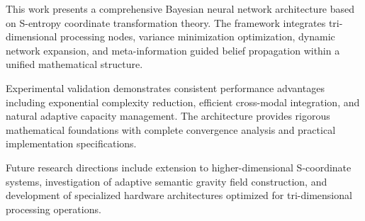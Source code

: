 \documentclass[12pt,a4paper]{article}
\begin{document}
This work presents a comprehensive Bayesian neural network architecture based on S-entropy coordinate transformation theory. The framework integrates tri-dimensional processing nodes, variance minimization optimization, dynamic network expansion, and meta-information guided belief propagation within a unified mathematical structure.

Experimental validation demonstrates consistent performance advantages including exponential complexity reduction, efficient cross-modal integration, and natural adaptive capacity management. The architecture provides rigorous mathematical foundations with complete convergence analysis and practical implementation specifications.

Future research directions include extension to higher-dimensional S-coordinate systems, investigation of adaptive semantic gravity field construction, and development of specialized hardware architectures optimized for tri-dimensional processing operations.
\end{document}
